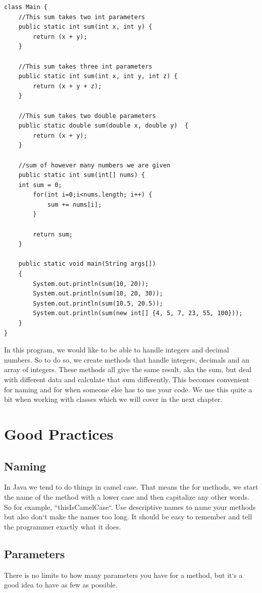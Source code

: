 \documentclass[11]{article}
\begin{document}
\begin{lstlisting}
class Main {
    //This sum takes two int parameters 
    public static int sum(int x, int y) { 
        return (x + y); 
    } 
  
    //This sum takes three int parameters 
    public static int sum(int x, int y, int z) { 
        return (x + y + z); 
    } 
  
    //This sum takes two double parameters 
    public static double sum(double x, double y)  { 
        return (x + y); 
    } 
    
    //sum of however many numbers we are given
    public static int sum(int[] nums) {
    int sum = 0;
    	for(int i=0;i<nums.length; i++) {
    		sum += nums[i];
    	}
    	
    	return sum;
    }
  
    public static void main(String args[]) 
    { 
        System.out.println(sum(10, 20)); 
        System.out.println(sum(10, 20, 30)); 
        System.out.println(sum(10.5, 20.5)); 
        System.out.println(sum(new int[] {4, 5, 7, 23, 55, 100}));
    } 
}
\end{lstlisting}

In this program, we would like to be able to handle integers and decimal numbers. So to do so, we create methods that handle integers, decimals and an array of integers. These methods all give the same result, aka the sum, but deal with different data and calculate that sum differently. This becomes convenient for naming and for when someone else has to use your code. We use this quite a bit when working with classes which we will cover in the next chapter.

\section{Good Practices}
\subsection{Naming}
In Java we tend to do things in camel case. That means the for methods, we start the name of the method with a lower case and then capitalize any other words. So for example, ``thisIsCamelCase``. Use descriptive names to name your methods but also don`t make the names too long. It should be easy to remember and tell the programmer exactly what it does.
\subsection{Parameters}
There is no limits to how many parameters you have for a method, but it`s a good idea to have as few as possible.
\end{document}

